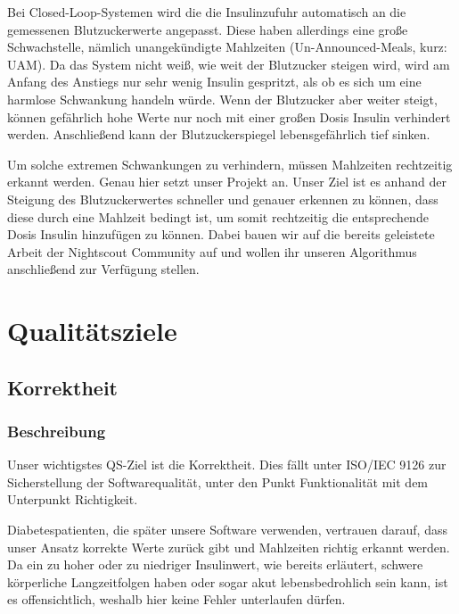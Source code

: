 \documentclass[accentcolor=tud0b,12pt,paper=a4]{tudreport}
\begin{document}
Bei Closed-Loop-Systemen wird die die Insulinzufuhr automatisch an die gemessenen Blutzuckerwerte angepasst. Diese haben allerdings eine große Schwachstelle, nämlich unangekündigte Mahlzeiten (Un-Announced-Meals, kurz: UAM). Da das System nicht weiß, wie weit der Blutzucker steigen wird, wird am Anfang des Anstiegs nur sehr wenig Insulin gespritzt, als ob es sich um eine harmlose Schwankung handeln würde. Wenn der Blutzucker aber weiter steigt, können gefährlich hohe Werte nur noch mit einer großen Dosis Insulin verhindert werden. Anschließend kann der Blutzuckerspiegel lebensgefährlich tief sinken.

Um solche extremen Schwankungen zu verhindern, müssen Mahlzeiten rechtzeitig erkannt werden. Genau hier setzt unser Projekt an. Unser Ziel ist es anhand der Steigung des Blutzuckerwertes schneller und genauer erkennen zu können, dass diese durch eine Mahlzeit bedingt ist, um somit rechtzeitig die entsprechende Dosis Insulin hinzufügen zu können. Dabei bauen wir auf die bereits geleistete Arbeit der Nightscout Community auf und wollen ihr unseren Algorithmus anschließend zur Verfügung stellen.





	\chapter{Qualitätsziele}
        \section{Korrektheit}
    
	\subsection{Beschreibung}
Unser wichtigstes QS-Ziel ist die Korrektheit. Dies fällt unter ISO/IEC 9126 zur Sicherstellung der Softwarequalität, unter den Punkt Funktionalität mit dem Unterpunkt Richtigkeit.

Diabetespatienten, die später unsere Software verwenden, vertrauen darauf, dass unser Ansatz korrekte Werte zurück gibt und Mahlzeiten richtig erkannt werden. Da ein zu hoher oder zu niedriger Insulinwert, wie bereits erläutert, schwere körperliche Langzeitfolgen haben oder sogar akut lebensbedrohlich sein kann, ist es offensichtlich, weshalb hier keine Fehler unterlaufen dürfen.
\end{document}
